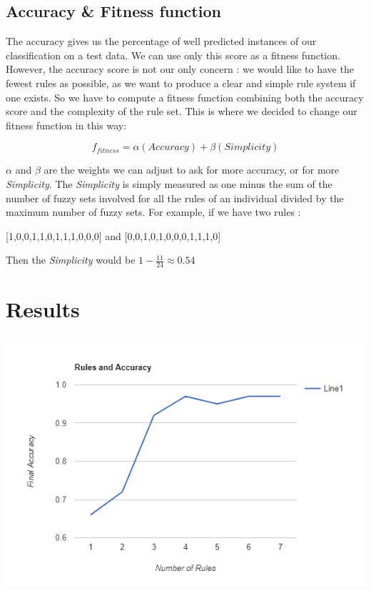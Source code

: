 \documentclass[a4paper,12pt]{article}
\begin{document}
\subsection{Accuracy \& Fitness function}

The accuracy gives us the percentage of well predicted instances of our classification on a test data. We can use only this score as a fitness function.
However, the accuracy score is not our only concern : we would like to have the fewest rules as possible, as we want to produce a clear and simple rule system if one exists. So we have to compute a fitness function combining both the accuracy score and the complexity of the rule set.
This is where we decided to change our fitness function in this way:

\[f_{fitness}=\alpha (Accuracy)+\beta(Simplicity)\]

$\alpha$ and $\beta$ are the weights we can adjust to ask for more accuracy, or for more \textit{Simplicity}.
The \textit{Simplicity} is simply measured as one minus the sum of the number of fuzzy sets involved for all the rules of an individual divided by the maximum number of fuzzy sets. 
For example, if we have two rules :
\begin{center}[1,0,0,1,1,0,1,1,1,0,0,0] and [0,0,1,0,1,0,0,0,1,1,1,0]
\end{center}
Then the \textit{Simplicity} would be $1 - \frac{11}{24} \approx 0.54	$


\section{Results}

\begin{center}
\includegraphics[scale=0.5]{accresult}
\end{center}
\end{document}
